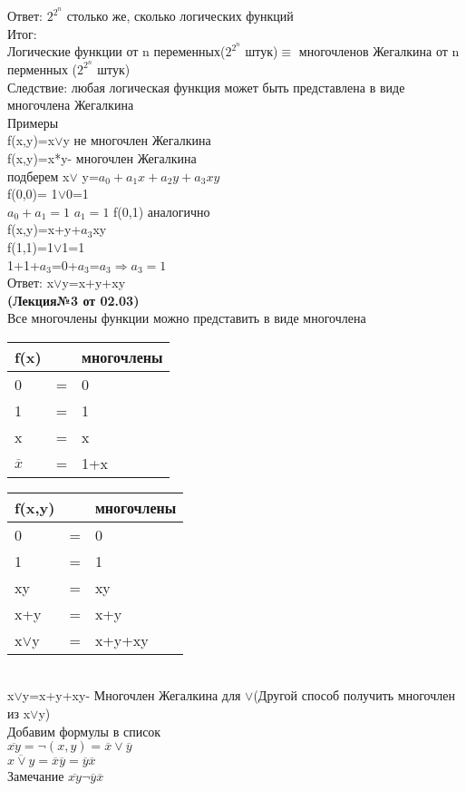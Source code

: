 \documentclass{article}
\begin{document}
Ответ: $2^{2^n}$ столько же, сколько логических функций\\
Итог:\\
Логические функции от n переменных($2^{2^n}$ штук)$\equiv$ многочленов Жегалкина от n перменных ($2^{2^n}$ штук)\\
Следствие: любая логическая функция может быть представлена в виде многочлена Жегалкина\\
Примеры\\
f(x,y)=x$\vee$y не многочлен Жегалкина\\
f(x,y)=x*y- многочлен Жегалкина\\
подберем x$\vee$ y=$a_0+a_1x+a_2y+a_3xy$\\
f(0,0)= 1$\vee$0=1\\
$a_0+a_1=1$ $a_1=1$
f(0,1) аналогично\\
f(x,y)=x+y+$a_3$xy\\
f(1,1)=1$\vee$1=1\\
1+1+$a_3$=0+$a_3$=$a_3 \Rightarrow a_3=1$\\
Ответ: x$\vee$y=x+y+xy\\
\textbf{(Лекция№3 от 02.03)}\\
Все многочлены функции можно представить в виде многочлена\\
\begin{tabular}{lll}
f(x)&&многочлены \\
\hline
0&=&0\\
1&=&1\\
x&=&x\\
$\overline{x}$&=&1+x\\
\end{tabular} \begin{tabular}{lll}
f(x,y)&&многочлены \\
\hline
0&=&0\\
1&=&1\\
xy&=&xy\\
x+y&=&x+y\\
x$\vee$y&=&x+y+xy\\
\end{tabular}\\
x$\vee$y=x+y+xy- Многочлен Жегалкина для $\vee$(Другой способ получить многочлен из x$\vee$y)\\
Добавим формулы в список\\
$\overline{xy}=\neg(x,y)=\overline{x}\vee\overline{y}$\\
$\overline{x\vee y}=\overline{x}\overline{y}=\overline{y}\overline{x}$\\
Замечание $\overline{xy}\neg \overline{y}\overline{x}$\\
\end{document}
